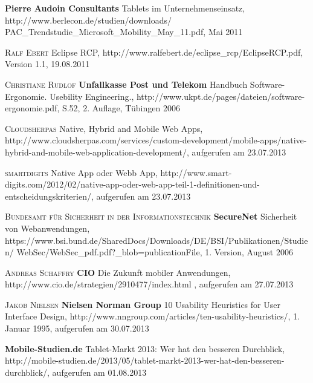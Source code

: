 \begin{thebibliography}{---}
                 \textbf{Pierre Audoin Consultants}
                 Tablets im Unternehmenseinsatz, http://www.berlecon.de/studien/downloads/
                 PAC\_Trendstudie\_Microsoft\_Mobility\_May\_11.pdf,  Mai 2011
 
               \textsc{Ralf Ebert}
              Eclipse RCP, http://www.ralfebert.de/eclipse\_rcp/EclipseRCP.pdf, Version 1.1, 19.08.2011
  			
           \textsc{Christiane Rudlof}
          \textbf{Unfallkasse Post und Telekom}
          Handbuch Software-Ergonomie. Usebility Engineering., http://www.ukpt.de/pages/dateien/software-ergonomie.pdf, S.52, 2. Auflage, Tübingen 2006

           \textsc{Cloudsherpas}
          Native, Hybrid and Mobile Web Apps, http://www.cloudsherpas.com/services/custom-development/mobile-apps/native-hybrid-and-mobile-web-application-development/, aufgerufen am 23.07.2013

          
           \textsc{smartdigits}
          Native App oder Webb App, http://www.smart-digits.com/2012/02/native-app-oder-web-app-teil-1-definitionen-und-entscheidungskriterien/, aufgerufen am 23.07.2013
          
           \textsc{Bundesamt für Sicherheit in der Informationstechnik}
           \textbf{SecureNet}
          Sicherheit von Webanwendungen, https://www.bsi.bund.de/SharedDocs/Downloads/DE/BSI/Publikationen/Studien/
          WebSec/WebSec\_pdf.pdf?\_blob=publicationFile, 1. Version, August 2006

           \textsc{Andreas Schaffry}
           \textbf{CIO}
          Die Zukunft mobiler Anwendungen, http://www.cio.de/strategien/2910477/index.html  , aufgerufen am 27.07.2013

			\textsc{Jakob Nielsen}
            \textbf{Nielsen Norman Group}
            10 Usability Heuristics for User Interface Design, http://www.nngroup.com/articles/ten-usability-heuristics/, 1. Januar 1995, aufgerufen am 30.07.2013

             \textbf{Mobile-Studien.de}
             Tablet-Markt 2013: Wer hat den besseren Durchblick, http://mobile-studien.de/2013/05/tablet-markt-2013-wer-hat-den-besseren-durchblick/, aufgerufen am 01.08.2013
 

\end{thebibliography}
